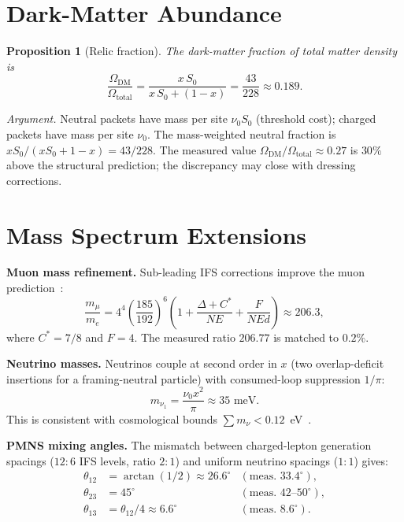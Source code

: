 \documentclass[11pt,twocolumn]{article}
\newtheorem{proposition}{Proposition}
\begin{document}
\section{Dark-Matter Abundance}
\label{sec:dm}

\begin{proposition}[Relic fraction]
\label{prop:dm}
The dark-matter fraction of total matter density is
\begin{equation}
\frac{\Omega_{\mathrm{DM}}}{\Omega_{\mathrm{total}}} = \frac{x\,S_0}{x\,S_0+(1{-}x)} = \frac{43}{228}\approx 0.189.
\end{equation}
\end{proposition}

\textit{Argument.}
Neutral packets have mass per site $\nu_0 S_0$ (threshold cost); charged packets have mass per site $\nu_0$.
The mass-weighted neutral fraction is $x S_0/(x S_0+1{-}x)=43/228$.
The measured value $\Omega_{\mathrm{DM}}/\Omega_{\mathrm{total}}\approx 0.27$ is $30\%$ above the structural prediction; the discrepancy may close with dressing corrections.

\section{Mass Spectrum Extensions}
\label{sec:mass}

\textbf{Muon mass refinement.}
Sub-leading IFS corrections improve the muon prediction~\cite{mayes2026ud}:
\begin{equation}
\frac{m_\mu}{m_e} = 4^4\!\left(\frac{185}{192}\right)^{\!6}\!\left(1+\frac{\Delta{+}C^*}{NE}+\frac{F}{NEd}\right)\approx 206.3,
\label{eq:muon}
\end{equation}
where $C^*=7/8$ and $F=4$.
The measured ratio $206.77$ is matched to $0.2\%$.

\textbf{Neutrino masses.}
Neutrinos couple at second order in $x$ (two overlap-deficit insertions for a framing-neutral particle) with consumed-loop suppression $1/\pi$:
\begin{equation}
m_{\nu_1} = \frac{\nu_0 x^2}{\pi}\approx 35\text{ meV}.
\label{eq:neutrino}
\end{equation}
This is consistent with cosmological bounds $\sum m_\nu<0.12$~eV~\cite{planck2018}.

\textbf{PMNS mixing angles.}
The mismatch between charged-lepton generation spacings ($12{:}6$ IFS levels, ratio $2{:}1$) and uniform neutrino spacings ($1{:}1$) gives:
\begin{align}
\theta_{12} &= \arctan(1/2)\approx 26.6^\circ &(\text{meas.\ }33.4^\circ),\label{eq:t12}\\
\theta_{23} &= 45^\circ &(\text{meas.\ }42\text{--}50^\circ),\label{eq:t23}\\
\theta_{13} &= \theta_{12}/4\approx 6.6^\circ &(\text{meas.\ }8.6^\circ).\label{eq:t13}
\end{align}
\end{document}
